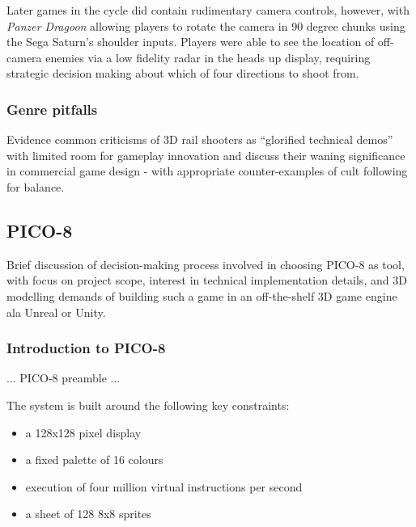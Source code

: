 \documentclass{article}
\begin{document}

Later games in the cycle did contain rudimentary camera controls, however, with \textit{Panzer Dragoon}
allowing players to rotate the camera in 90 degree chunks using the Sega Saturn's shoulder inputs.
Players were able to see the location of off-camera enemies via a low fidelity radar in the heads up
display, requiring strategic decision making about which of four directions to shoot from.

\subsubsection*{Genre pitfalls}
Evidence common criticisms of 3D rail shooters as ``glorified technical demos'' with
limited room for gameplay innovation and discuss their waning significance in
commercial game design - with appropriate counter-examples of cult following for
balance.

\subsection{PICO-8}\label{pico}

Brief discussion of decision-making process involved in choosing PICO-8 as tool, with focus on
project scope, interest in technical implementation details, and 3D modelling demands of building
such a game in an off-the-shelf 3D game engine ala Unreal or Unity.
\subsubsection*{Introduction to PICO-8}

... PICO-8 preamble ...

The system is built around the following key constraints\cite{white}:

\begin{itemize}
   \item a 128x128 pixel display
   \item a fixed palette of 16 colours
   \item execution of four million virtual instructions per second
   \item a sheet of 128 8x8 sprites
\end{itemize}
\end{document}
